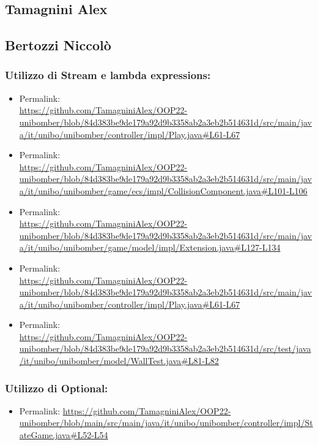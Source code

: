 \documentclass[a4paper,12pt]{report}
\begin{document}
\subsection*{Tamagnini Alex}

\subsection*{Bertozzi Niccolò}
\subsubsection*{Utilizzo di Stream e lambda expressions:}
\begin{itemize}
    \item Permalink: 
    \\ \url{https://github.com/TamagniniAlex/OOP22-unibomber/blob/84d383be9de179a92d9b3358ab2a3eb2b514631d/src/main/java/it/unibo/unibomber/controller/impl/Play.java#L61-L67}
    \item Permalink: 
    \\ \url{https://github.com/TamagniniAlex/OOP22-unibomber/blob/84d383be9de179a92d9b3358ab2a3eb2b514631d/src/main/java/it/unibo/unibomber/game/ecs/impl/CollisionComponent.java#L101-L106}
    \item Permalink: 
    \\ \url{https://github.com/TamagniniAlex/OOP22-unibomber/blob/84d383be9de179a92d9b3358ab2a3eb2b514631d/src/main/java/it/unibo/unibomber/game/model/impl/Extension.java#L127-L134}
    \item Permalink: 
    \\ \url{https://github.com/TamagniniAlex/OOP22-unibomber/blob/84d383be9de179a92d9b3358ab2a3eb2b514631d/src/main/java/it/unibo/unibomber/controller/impl/Play.java#L61-L67}
    \item Permalink: 
    \\ \url{https://github.com/TamagniniAlex/OOP22-unibomber/blob/84d383be9de179a92d9b3358ab2a3eb2b514631d/src/test/java/it/unibo/unibomber/model/WallTest.java#L81-L82}
\end{itemize}
\subsubsection*{Utilizzo di Optional:}
\begin{itemize}
    \item Permalink: \url{https://github.com/TamagniniAlex/OOP22-unibomber/blob/main/src/main/java/it/unibo/unibomber/controller/impl/StateGame.java#L52-L54}
\end{itemize}
\end{document}
